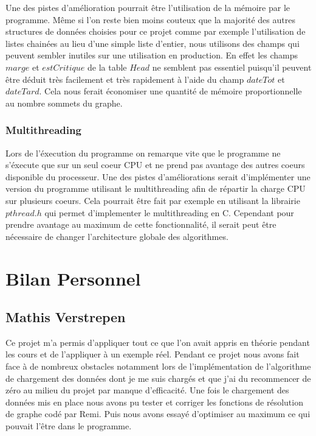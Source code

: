 \documentclass{article}
\begin{document}
Une des pistes d'amélioration pourrait être l'utilisation de la mémoire par le programme. Même si l'on reste bien moins couteux que la majorité des autres structures de données choisies pour ce projet comme par exemple l'utilisation de listes chainées au lieu d'une simple liste d'entier, nous utilisons des champs qui peuvent sembler inutiles sur une utilisation en production. En effet les champs $marge$ et $estCritique$ de la table $Head$ ne semblent pas essentiel puisqu'il peuvent être déduit très facilement et très rapidement à l'aide du champ $dateTot$ et $dateTard$. Cela nous ferait économiser une quantité de mémoire proportionnelle au nombre sommets du graphe.

\subsubsection{Multithreading}

Lors de l'éxecution du programme on remarque vite que le programme ne s'éxecute que sur un seul coeur CPU et ne prend pas avantage des autres coeurs disponible du processeur. Une des pistes d'améliorations serait d'implémenter une version du programme utilisant le multithreading afin de répartir la charge CPU sur plusieurs coeurs. Cela pourrait être fait par exemple en utilisant la librairie $pthread.h$ qui permet d'implementer le multithreading en C. Cependant pour prendre avantage au maximum de cette fonctionnalité, il serait peut être nécessaire de changer l'architecture globale des algorithmes.

\section{Bilan Personnel}

\subsection{Mathis Verstrepen}

Ce projet m'a permis d'appliquer tout ce que l'on avait appris en théorie pendant les cours et de l'appliquer à un exemple réel.
Pendant ce projet nous avons fait face à de nombreux obstacles notamment lors de l'implémentation de l'algorithme de chargement des données dont je me suis chargés et que j'ai du recommencer de zéro au milieu du projet par manque d'efficacité. Une fois le chargement des données mis en place nous avons pu tester et corriger les fonctions de résolution de graphe codé par Remi. Puis nous avons essayé d'optimiser au maximum ce qui pouvait l'être dans le programme.
\end{document}
